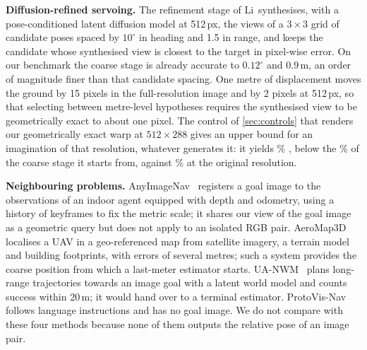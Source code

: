 \noindent\textbf{Diffusion-refined servoing.} The refinement stage of Li~\etal synthesises, with a pose-conditioned latent diffusion model at 512\,px, the views of a $3{\times}3$ grid of candidate poses spaced by $10^\circ$ in heading and 1.5 in range, and keeps the candidate whose synthesised view is closest to the target in pixel-wise error. On our benchmark the coarse stage is already accurate to $0.12^\circ$ and 0.9\,m, an order of magnitude finer than that candidate spacing. One metre of displacement moves the ground by 15 pixels in the full-resolution image and by 2 pixels at 512\,px, so that selecting between metre-level hypotheses requires the synthesised view to be geometrically exact to about one pixel. The control of \cref{sec:controls} that renders our geometrically exact warp at $512{\times}288$ gives an upper bound for an imagination of that resolution, whatever generates it: it yields \ctLowResSRd\% \SRd, below the \ctCoarseSRd\% of the coarse stage it starts from, against \ctFullSRd\% at the original resolution. 

\noindent\textbf{Neighbouring problems.} AnyImageNav~\cite{deng2026anyimagenav} registers a goal image to the observations of an indoor agent equipped with depth and odometry, using a history of keyframes to fix the metric scale; it shares our view of the goal image as a geometric query but does not apply to an isolated RGB pair. AeroMap3D~\cite{deng2026aeromap3d} localises a UAV in a geo-referenced map from satellite imagery, a terrain model and building footprints, with errors of several metres; such a system provides the coarse position from which a last-meter estimator starts. UA-NWM~\cite{zhu2026uanwm} plans long-range trajectories towards an image goal with a latent world model and counts success within 20\,m; it would hand over to a terminal estimator. ProtoVis-Nav~\cite{sui2026protovisnav} follows language instructions and has no goal image. We do not compare with these four methods because none of them outputs the relative pose of an image pair.
